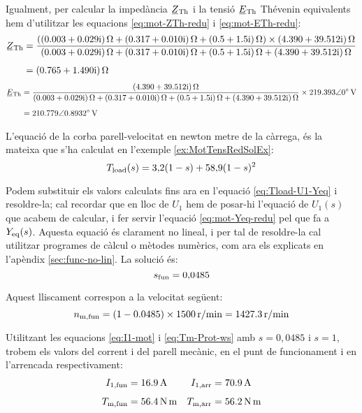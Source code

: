 \begin{exemple}
	Igualment, per calcular  la impedància $\cmplx{Z}\ped{Th}$ i la tensió $\cmplx{E}\ped{Th}$ Thévenin equivalents hem d'utilitzar les equacions \eqref{eq:mot-ZTh-redu} i \eqref{eq:mot-ETh-redu}:
	\begin{align*}
		\cmplx{Z}\ped{Th} &= \frac{(\complexqty{0,003+j0,029}{\ohm} + \complexqty{0,317+j0,010}{\ohm} +  \complexqty{0,5+j1,5}{\ohm})\times\complexqty{4,390+j39,512}{\ohm}}
		{\complexqty{0,003+j0,029}{\ohm} + \complexqty{0,317+j0,010}{\ohm} + \complexqty{0,5+j1,5}{\ohm}+\complexqty{4,390+j39,512}{\ohm}}  \\[1ex]   
		&= \complexqty{0,765+j1,490}{\ohm}
	\end{align*}
	\vspace{-7mm}
	\begin{align*}		
		\cmplx{E}\ped{Th}  &= \frac{\complexqty{4,390+j39,512}{\ohm}}
		{\complexqty{0,003+j0,029}{\ohm} + \complexqty{0,317+j0,010}{\ohm} + \complexqty{0,5+j1,5}{\ohm}+\complexqty{4,390+j39,512}{\ohm}}\times
		\complexqty{219,393:0}{V}  \\[1ex]   
		&=  \complexqty{210,779:0,8932}{V}
	\end{align*}
	
	L'equació de la corba parell-velocitat en newton metre de la càrrega, és la mateixa que s'ha calculat en l'exemple  \ref{ex:MotTensRedSolEx}:
	\[
		T_\mathrm{load}(s) = 3{,}2 (1-s) + 58{,}9 (1-s)^2
	\]
	
	Podem  substituir els  valors calculats fins ara en l'equació \eqref{eq:Tload-U1-Yeq} i resoldre-la; cal recordar que en lloc de $U_1$ hem de posar-hi l'equació de $U_1(s)$ que acabem de calcular, i fer servir l'equació \eqref{eq:mot-Yeq-redu} pel que fa a $Y_\mathrm{eq}(s)$. Aquesta equació és clarament no lineal, i per tal de resoldre-la cal utilitzar programes de càlcul o mètodes numèrics, com ara els explicats en l'apèndix \ref{sec:func-no-lin}. La solució és:
	\[
		s_\mathrm{fun} = 0{,}0485
	\]
	
	Aquest lliscament correspon a la velocitat següent:
	\[
		n_\mathrm{m,fun}= (1-\num{0,0485})\times \qty{1500}{r/min} = \qty{1427,3}{r/min}
	\]
	
	Utilitzant les equacions \eqref{eq:I1-mot} i \eqref{eq:Tm-Prot-ws} amb $s=0{,}0485$ i $s=1$, trobem els valors del corrent i del parell mecànic, en el punt de funcionament  i en l'arrencada respectivament:
	\begin{align*}
		I_\mathrm{1,fun} &= \qty{16,9}{A} &
		I_\mathrm{1,arr} &= \qty{70,9}{A} \\[1ex] 
		T_\mathrm{m,fun} &=  \qty{56,4}{N.m} & 
		T_\mathrm{m,arr} &=  \qty{56,2}{N.m}
	\end{align*}
	

\end{exemple}

